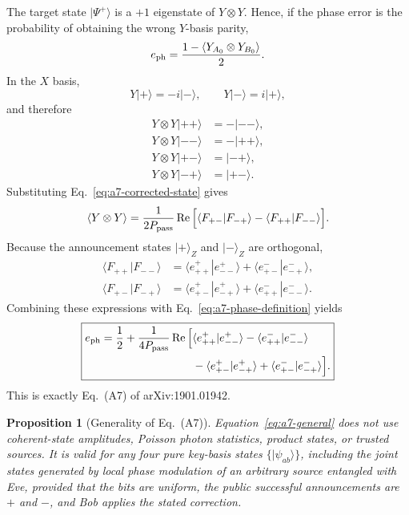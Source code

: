 \documentclass[11pt]{article}
\newtheorem{proposition}{Proposition}
\theoremstyle{remark}
\begin{document}
The target state \(|\Psi^+\rangle\) is a \(+1\) eigenstate of
\(Y\otimes Y\).  Hence, if the phase error is the probability of obtaining
the wrong \(Y\)-basis parity,
\begin{equation}
    e_{\rm ph}
    =
    \frac{1-\langle Y_{A_0}\otimes Y_{B_0}\rangle}{2}.
    \label{eq:a7-phase-definition}
\end{equation}
In the \(X\) basis,
\[
    Y|+\rangle=-i|-\rangle,
    \qquad
    Y|-\rangle=i|+\rangle,
\]
and therefore
\begin{align}
    Y\otimes Y|++\rangle&=-|--\rangle,\\
    Y\otimes Y|--\rangle&=-|++\rangle,\\
    Y\otimes Y|+-\rangle&=|-+\rangle,\\
    Y\otimes Y|-+\rangle&=|+-\rangle.
\end{align}
Substituting Eq.~\eqref{eq:a7-corrected-state} gives
\begin{equation}
\begin{aligned}
    \langle Y\otimes Y\rangle
    =
    \frac{1}{2P_{\rm pass}}
    \operatorname{Re}\Big[
       \langle F_{+-}|F_{-+}\rangle
       -
       \langle F_{++}|F_{--}\rangle
    \Big].
    \label{eq:a7-yy-F}
\end{aligned}
\end{equation}
Because the announcement states \(|+\rangle_Z\) and \(|-\rangle_Z\) are
orthogonal,
\begin{align}
    \langle F_{++}|F_{--}\rangle
    &=
    \langle e^+_{++}|e^+_{--}\rangle
    +
    \langle e^-_{+-}|e^-_{-+}\rangle,\\
    \langle F_{+-}|F_{-+}\rangle
    &=
    \langle e^+_{+-}|e^+_{-+}\rangle
    +
    \langle e^-_{++}|e^-_{--}\rangle.
\end{align}
Combining these expressions with
Eq.~\eqref{eq:a7-phase-definition} yields
\begin{equation}
\boxed{
\begin{aligned}
    e_{\rm ph}
    =
    \frac12
    +
    \frac{1}{4P_{\rm pass}}
    \operatorname{Re}\Big[
      &\langle e^+_{++}|e^+_{--}\rangle
      -
      \langle e^-_{++}|e^-_{--}\rangle\\
      &-
      \langle e^+_{+-}|e^+_{-+}\rangle
      +
      \langle e^-_{+-}|e^-_{-+}\rangle
    \Big].
\end{aligned}}
    \label{eq:a7-general}
\end{equation}
This is exactly Eq.~(A7) of arXiv:1901.01942.

\begin{proposition}[Generality of Eq.~(A7)]
Equation~\eqref{eq:a7-general} does not use coherent-state amplitudes,
Poisson photon statistics, product states, or trusted sources.  It is valid
for any four pure key-basis states \(\{|\psi_{ab}\rangle\}\), including the
joint states generated by local phase modulation of an arbitrary source
entangled with Eve, provided that the bits are uniform, the public successful
announcements are \(+\) and \(-\), and Bob applies the stated correction.
\end{proposition}
\end{document}
